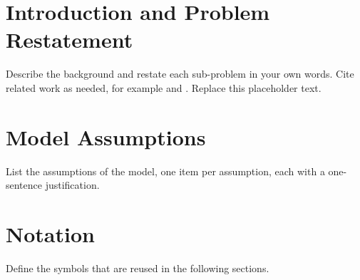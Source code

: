 %
%
%
%

\section{Introduction and Problem Restatement}

Describe the background and restate each sub-problem in your own words.
Cite related work as needed, for example \citep{hyndman2018forecasting}
and \citep{lecun2015deep}. Replace this placeholder text.

\section{Model Assumptions}

List the assumptions of the model, one item per assumption, each with a
one-sentence justification.

\section{Notation}

Define the symbols that are reused in the following sections.

